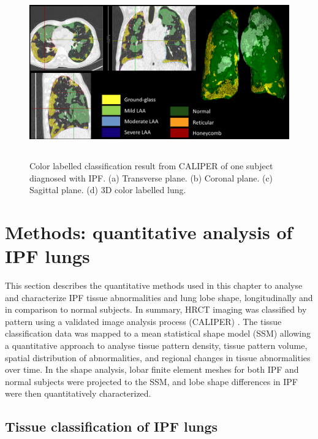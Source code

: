 \begin{figure}[htbp]
  \centering 
  \includegraphics[height=2.9in]{QuantitativeAnalysis/Image/CALIPERResults.png}
  \caption{Color labelled classification result from CALIPER of one subject diagnosed with IPF.  (a) Transverse plane. (b) Coronal plane. (c) Sagittal plane. (d) 3D color labelled lung.}
  \label{fig:CALIPERResults}
\end{figure}


\section{Methods: quantitative analysis of IPF lungs}
This section describes the quantitative methods used in this chapter to analyse and characterize IPF tissue abnormalities and lung lobe shape, longitudinally and in comparison to normal subjects. In summary, HRCT imaging was classified by pattern using a validated image analysis process (CALIPER) \citep{maldonado2013automated,bartholmai2013quantitative,raghunath2014quantitative}. The tissue classification data was mapped to a mean statistical shape model (SSM) allowing a quantitative approach to analyse tissue pattern density, tissue pattern volume, spatial distribution of abnormalities, and regional changes in tissue abnormalities over time. In the shape analysis, lobar finite element meshes for both IPF and normal subjects were projected to the SSM, and lobe shape differences in IPF were then quantitatively characterized.

\subsection{Tissue classification of IPF lungs}
